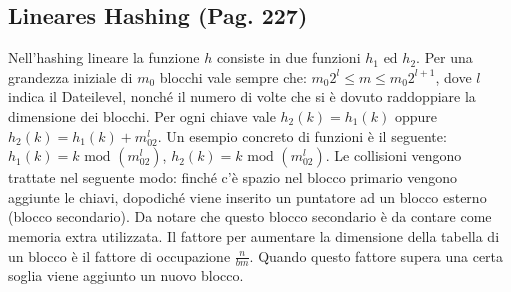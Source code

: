 \documentclass[a4paper]{book}
\begin{document}
\subsection{Lineares Hashing (Pag. 227)}
Nell'hashing lineare la funzione $h$ consiste in due funzioni $h_1$ ed $h_2$. Per una grandezza iniziale di $m_0$ blocchi vale sempre che: $m_0 2^ l\leq m \leq m_0 2^{l+1}$, dove $l$ indica il Dateilevel, nonché il numero di volte che si è dovuto raddoppiare la dimensione dei blocchi. Per ogni chiave vale $h_2(k)=h_1(k)$ oppure $h_2(k)=h_1(k)+m_02^l$. Un esempio concreto di funzioni è il seguente: $h_1(k)=k \mbox{ mod } (m_02^l)$, $h_2(k)=k \mbox{ mod } (m_02^l)$. Le collisioni vengono trattate nel seguente modo: finché c'è spazio nel blocco primario vengono aggiunte le chiavi, dopodiché viene inserito un puntatore ad un blocco esterno (blocco secondario). Da notare che questo blocco secondario è da contare come memoria extra utilizzata. Il fattore per aumentare la dimensione della tabella di un blocco è il fattore di occupazione $\frac{n}{bm}$. Quando questo fattore supera una certa soglia viene aggiunto un nuovo blocco.
\end{document}
